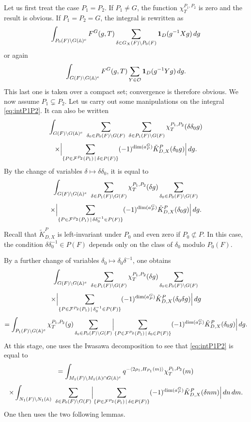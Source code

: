 \begin{paragr}
\begin{preuve}
Let us first treat the case $P_1=P_2$. If $P_1\neq G$, the function $\chi_T^{P_1,P_2}$ is zero and the result is obvious. If $P_1=P_2=G$, the integral is rewritten as
$$\int_{P_0(F)\backslash G(\mathbb{A})^e} F^G(g,T)\sum_{\delta\in G_X(F)\backslash P_0(F)} \mathbf{1}_D(g^{-1}Xg)\, dg$$
or again
$$\int_{G(F)\backslash G(\mathbb{A})^e} F^G(g,T)\sum_{Y\in \mathcal{O}} \mathbf{1}_D(g^{-1}Yg)\, dg.$$
This last one is taken over a compact set; convergence is therefore obvious. We now assume $P_1\subsetneq P_2$. Let us carry out some manipulations on the integral \eqref{eq:intP1P2}. It can also be written
$$\int_{G(F)\backslash G(\AAA)^e}\ \sum_{\delta_0\in P_0(F)\backslash G(F)}\ \sum_{\delta\in P_1(F)\backslash G(F)} \chi_T^{P_1,P_2}(\delta\delta_0 g)$$
$$\times \Bigl|\sum_{\{P\in \mathcal{F}^{P_2}(P_1)\,|\,\delta\in P(F)\}} (-1)^{\dim(a_P^G)}\tilde{K}^P_{D,X}(\delta_0 g)\Bigr|\, dg.$$
By the change of variables $\delta\mapsto \delta\delta_0$, it is equal to
$$\int_{G(F)\backslash G(\mathbb{A})^e}\ \sum_{\delta\in P_1(F)\backslash G(F)} \chi_T^{P_1,P_2}(\delta g)\sum_{\delta_0\in P_0(F)\backslash G(F)}$$
$$\times \Bigl|\sum_{\{P\in \mathcal{F}^{P_2}(P_1)\,|\,\delta\delta_0^{-1}\in P(F)\}} (-1)^{\dim(a_P^G)}\tilde{K}^P_{D,X}(\delta_0 g)\Bigr|\, dg.$$
Recall that $\tilde{K}^P_{D,X}$ is left-invariant under $P_0$ and even zero if $P_0\not\subset P$. In this case, the condition $\delta\delta_0^{-1}\in P(F)$ depends only on the class of $\delta_0$ modulo $P_0(F)$.

By a further change of variables $\delta_0\mapsto \delta_0\delta^{-1}$, one obtains
$$\int_{G(F)\backslash G(\mathbb{A})^e}\ \sum_{\delta\in P_1(F)\backslash G(F)} \chi_T^{P_1,P_2}(\delta g)\sum_{\delta_0\in P_0(F)\backslash G(F)}$$
$$\times \Bigl|\sum_{\{P\in \mathcal{F}^{P_2}(P_1)\,|\,\delta_0^{-1}\in P(F)\}} (-1)^{\dim(a_P^G)}\tilde{K}^P_{D,X}(\delta_0\delta g)\Bigr|\, dg$$
$$=\int_{P_1(F)\backslash G(\mathbb{A})^e} \chi_T^{P_1,P_2}(g)\sum_{\delta_0\in P_0(F)\backslash G(F)}\Bigl|\sum_{\{P\in \mathcal{F}^{P_2}(P_1)\,|\,\delta_0\in P(F)\}} (-1)^{\dim(a_P^G)}\tilde{K}^P_{D,X}(\delta_0 g)\Bigr|\, dg.$$
At this stage, one uses the Iwasawa decomposition to see that \eqref{eq:intP1P2} is equal to
$$=\int_{M_1(F)\backslash M_1(\mathbb{A})\cap G(\mathbb{A})^e} q^{-\langle 2\rho_1,H_{P_1}(m)\rangle}\chi_T^{P_1,P_2}(m)$$
$$\times \int_{N_1(F)\backslash N_1(\AAA)}\ \sum_{\delta\in P_0(F)\backslash G(F)}\Bigl|\sum_{\{P\in \fc^{P_2}(P_1)\,|\,\delta\in P(F)\}} (-1)^{\dim(a_P^G)}\tilde{K}^P_{D,X}(\delta nm)\Bigr|\, dn\, dm.$$
One then uses the two following lemmas.


\end{preuve}
\end{paragr}
